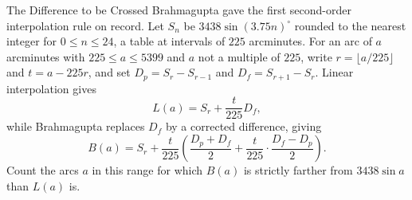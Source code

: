 \begin{problem}{The Difference to be Crossed}
Brahmagupta gave the first second-order interpolation rule on record. Let \(S_n\) be \(3438\sin(3.75n)^\circ\) rounded to the nearest integer for \(0\le n\le24\), a table at intervals of \(225\) arcminutes. For an arc of \(a\) arcminutes with \(225\le a\le5399\) and \(a\) not a multiple of \(225\), write \(r=\lfloor a/225\rfloor\) and \(t=a-225r\), and set \(D_p=S_r-S_{r-1}\) and \(D_f=S_{r+1}-S_r\). Linear interpolation gives
    \[
    L(a)=S_r+\frac{t}{225}D_f,
    \]
while Brahmagupta replaces \(D_f\) by a corrected difference, giving
    \[
    B(a)=S_r+\frac{t}{225}\left(\frac{D_p+D_f}{2}
    +\frac{t}{225}\cdot\frac{D_f-D_p}{2}\right).
    \]    
Count the arcs \(a\) in this range for which \(B(a)\) is strictly farther from \(3438\sin a\) than \(L(a)\) is.
\end{problem}